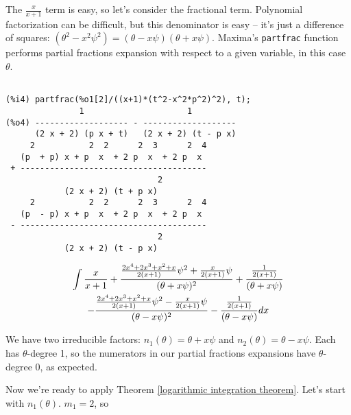 The $\frac{x}{x+1}$ term is easy, so let's consider the fractional
term.  Polynomial factorization can be difficult, but this denominator
is easy -- it's just a difference of squares: $(\theta^2 - x^2\psi^2) = (\theta-x\psi)(\theta+x\psi)$.
Maxima's {\tt partfrac} function performs partial fractions
expansion with respect to a given variable, in this case $\theta$.


\vfill\eject

{\small\begin{verbatim}

(%i4) partfrac(%o1[2]/((x+1)*(t^2-x^2*p^2)^2), t);
               1                     1
(%o4) ------------------- - -------------------
      (2 x + 2) (p x + t)   (2 x + 2) (t - p x)
     2           2  2      2  3      2  4
   (p  + p) x + p  x  + 2 p  x  + 2 p  x
 + --------------------------------------
                               2
            (2 x + 2) (t + p x)
     2           2  2      2  3      2  4
   (p  - p) x + p  x  + 2 p  x  + 2 p  x
 - --------------------------------------
                               2
            (2 x + 2) (t - p x)
\end{verbatim}}

\begin{comment}
\begin{multline*}
\int {x\over{x+1}} + \frac{(2x^4+2x^3+x^2+x)\psi^2 + x \psi}{2(x+1)(\theta + x \psi)^2}
       + \frac{1}{2(x+1)(\theta + x \psi)} \\
       - \frac{(2x^4+2x^3+x^2+x)\psi^2 - x \psi}{2(x+1)(\theta - x \psi)^2}
       - \frac{1}{2(x+1)(\theta - x \psi)} dx$$
\end{multline*}
\end{comment}

\begin{multline*}
\int {x\over{x+1}} + \frac{\frac{2x^4+2x^3+x^2+x}{2(x+1)}\psi^2 + \frac{x}{2(x+1)} \psi}{(\theta + x \psi)^2}
       + \frac{\frac{1}{2(x+1)}}{(\theta + x \psi)} \\
       - \frac{\frac{2x^4+2x^3+x^2+x}{2(x+1)}\psi^2 - \frac{x}{2(x+1)} \psi}{(\theta - x \psi)^2}
       - \frac{\frac{1}{2(x+1)}}{(\theta - x \psi)} dx
\end{multline*}


We have two irreducible factors: $n_1(\theta) = \theta + x \psi$ and
$n_2(\theta) = \theta - x \psi$.  Each has $\theta$-degree 1, so
the numerators in our partial fractions expansions have
$\theta$-degree 0, as expected.

Now we're ready to apply
Theorem \ref{logarithmic integration theorem}.  Let's start with
$n_1(\theta)$.  $m_1=2$, so

